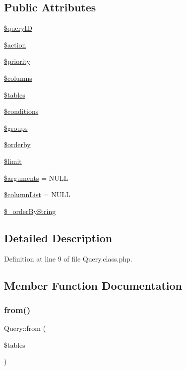 \subsection*{Public Attributes}
\begin{DoxyCompactItemize}
\item 
\hyperlink{classQuery_a67666b2fcd6c60e73d8329f7d22044dc}{\$query\+ID}
\item 
\hyperlink{classQuery_a62c36010085369fc0508ea548660be9f}{\$action}
\item 
\hyperlink{classQuery_a4d64f61fd525a70ebc2aaa6ab8291e20}{\$priority}
\item 
\hyperlink{classQuery_a7cf97254cbd55fdbb9e149723498d9ba}{\$columns}
\item 
\hyperlink{classQuery_a5c74163d1615b141456b123c11fa9d92}{\$tables}
\item 
\hyperlink{classQuery_a5c71d786a82b2cc014968d2553b6bc9d}{\$conditions}
\item 
\hyperlink{classQuery_a76992fbfae6d700e65dfde28911a2475}{\$groups}
\item 
\hyperlink{classQuery_aa955216a83dfe57cdd9600b44b38ebac}{\$orderby}
\item 
\hyperlink{classQuery_abe481cf8b7f42b513a4f64cf7fb0ffea}{\$limit}
\item 
\hyperlink{classQuery_a49166e3c5f5198e4b899c8ee47b6258a}{\$arguments} = N\+U\+LL
\item 
\hyperlink{classQuery_a113bcdfdc3bf6acef684a06ae324334a}{\$column\+List} = N\+U\+LL
\item 
\hyperlink{classQuery_aaf035e5cfac7afe46163a6ba4c55c34b}{\$\+\_\+order\+By\+String}
\end{DoxyCompactItemize}


\subsection{Detailed Description}


Definition at line 9 of file Query.\+class.\+php.



\subsection{Member Function Documentation}
\mbox{\label{classQuery_a8c48087275e1fb408298c5c6295bbf20}} 
\subsubsection{\texorpdfstring{from()}{from()}}
{\footnotesize\ttfamily Query\+::from (\begin{DoxyParamCaption}\item[{}]{\$tables }\end{DoxyParamCaption})}

